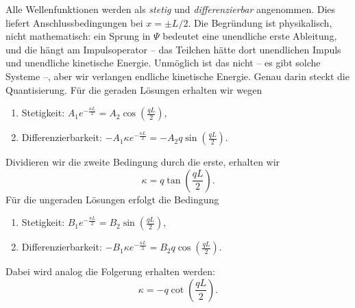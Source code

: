Alle Wellenfunktionen werden als \emph{stetig} und \emph{differenzierbar} angenommen. Dies liefert Anschlussbedingungen bei $x = \pm L/2$. Die Begründung ist physikalisch, nicht mathematisch: ein Sprung in $\Psi$ bedeutet eine unendliche erste Ableitung, und die hängt am Impulsoperator -- das Teilchen hätte dort unendlichen Impuls und unendliche kinetische Energie. Unmöglich ist das nicht -- es gibt solche Systeme --, aber wir verlangen endliche kinetische Energie. Genau darin steckt die Quantisierung. Für die geraden Lösungen erhalten wir wegen
\begin{enumerate}
	\item Stetigkeit: $A_1 e^{-\frac{\kappa L}{2}} = A_2 \cos\left(\frac{qL}{2}\right)$,
	\item Differenzierbarkeit: $-A_1\kappa e^{-\frac{\kappa L}{2}} = -A_2 q\sin\left(\frac{qL}{2}\right)$.
\end{enumerate}
Dividieren wir die zweite Bedingung durch die erste, erhalten wir
\begin{equation}\label{eq:symmcond}
	\kappa = q\tan\left(\frac{qL}{2}\right).
\end{equation}
Für die ungeraden Lösungen erfolgt die Bedingung  
\begin{enumerate}
	\item Stetigkeit: $B_1 e^{-\frac{\kappa L}{2}} = B_2 \sin\left(\frac{qL}{2}\right)$,
	\item Differenzierbarkeit: $-B_1\kappa e^{-\frac{\kappa L}{2}} = B_2 q\cos\left(\frac{qL}{2}\right)$.
\end{enumerate}
Dabei wird analog die Folgerung erhalten werden:
\begin{equation}\label{eq:unsymm}
	\kappa = -q\cot\left(\frac{qL}{2}\right).
\end{equation}

